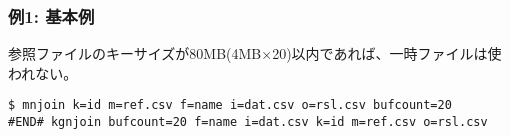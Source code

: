 \subsubsection*{例1: 基本例}

参照ファイルのキーサイズが80MB(4MB×20)以内であれば、一時ファイルは使われない。


\begin{Verbatim}[baselinestretch=0.7,frame=single]
$ mnjoin k=id m=ref.csv f=name i=dat.csv o=rsl.csv bufcount=20
#END# kgnjoin bufcount=20 f=name i=dat.csv k=id m=ref.csv o=rsl.csv
\end{Verbatim}
